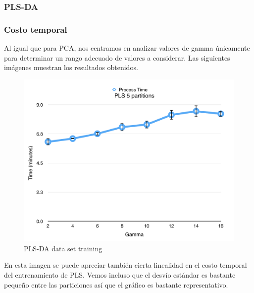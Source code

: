 \subsubsection{PLS-DA}

\subsubsection*{Costo temporal}

Al igual que para PCA, nos centramos en analizar valores de gamma únicamente para determinar un rango adecuado de valores a considerar. Las siguientes imágenes muestran los resultados obtenidos.

\begin{figure}[h!]
  \begin{center}
	\includegraphics[scale=0.7]{exp2/PLS-Process-Time.png}
	\caption{PLS-DA data set training}
  \end{center}
\end{figure}

En esta imagen se puede apreciar también cierta linealidad en el costo temporal del entrenamiento de PLS. Vemos incluso que el desvío estándar es bastante pequeño entre las particiones así que el gráfico es bastante representativo.

